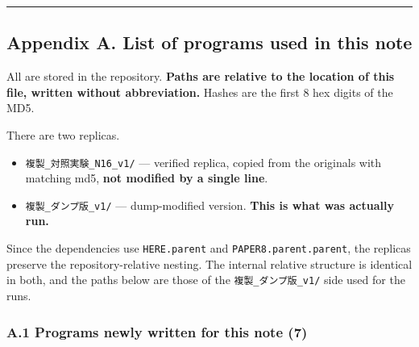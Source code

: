 \documentclass[
  10pt,
]{article}
\providecommand{\tightlist}{%
  \setlength{\itemsep}{0pt}\setlength{\parskip}{0pt}}
\begin{document}
\begin{center}\rule{0.5\linewidth}{0.5pt}\end{center}

\subsection{Appendix A. List of programs used in this
note}\label{appendix-a.-list-of-programs-used-in-this-note}

All are stored in the repository. \textbf{Paths are relative to the
location of this file, written without abbreviation.} Hashes are the
first 8 hex digits of the MD5.

There are two replicas.

\begin{itemize}
\tightlist
\item
  \texttt{複製\_対照実験\_N16\_v1/} --- verified replica, copied from
  the originals with matching md5, \textbf{not modified by a single
  line}.
\item
  \texttt{複製\_ダンプ版\_v1/} --- dump-modified version. \textbf{This
  is what was actually run.}
\end{itemize}

Since the dependencies use \texttt{HERE.parent} and
\texttt{PAPER8.parent.parent}, the replicas preserve the
repository-relative nesting. The internal relative structure is
identical in both, and the paths below are those of the
\texttt{複製\_ダンプ版\_v1/} side used for the runs.

\subsubsection{A.1 Programs newly written for this note
(7)}\label{a.1-programs-newly-written-for-this-note-7}
\end{document}
